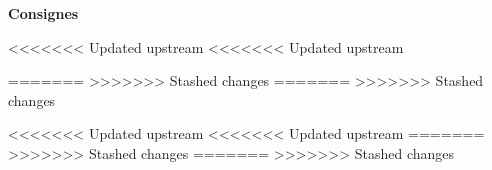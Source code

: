 

\noindent\textbf{Consignes}

<<<<<<< Updated upstream
<<<<<<< Updated upstream



=======
>>>>>>> Stashed changes
=======
>>>>>>> Stashed changes



<<<<<<< Updated upstream
<<<<<<< Updated upstream
=======
>>>>>>> Stashed changes
=======
>>>>>>> Stashed changes






